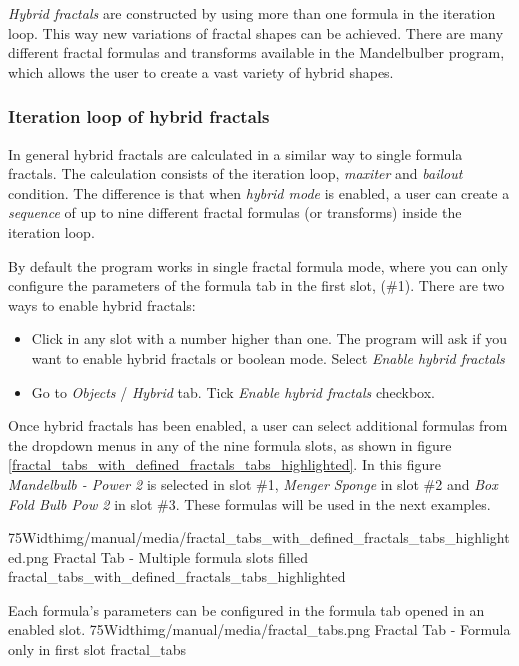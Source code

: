 \emph{Hybrid fractals} are constructed by using more than one formula in the iteration loop.
This way new variations of fractal shapes can be achieved. There are many different fractal formulas and transforms available in the Mandelbulber program, which allows the user to create a vast variety of hybrid shapes.

\subsubsection{Iteration loop of hybrid fractals}

In general hybrid fractals are calculated in a similar way to single formula fractals.
The calculation consists of the iteration loop, \emph{maxiter} and \emph{bailout} condition. The
difference is that when \emph{hybrid mode} is enabled, a user can create a \emph{sequence} of up to nine different fractal formulas (or transforms) inside the iteration loop. 

By default the program works in single fractal formula mode, where you can only configure the parameters of the formula tab in the first slot,
(\#1). There are two ways to enable hybrid fractals:
\begin{itemize}
	\item Click in any slot with a number higher than one. The program will ask if you want to
	enable hybrid fractals or boolean mode. Select \emph{Enable hybrid fractals}
	\item Go to \emph{Objects} / \emph{Hybrid} tab. Tick \emph{Enable hybrid fractals} checkbox.
\end{itemize}

Once hybrid fractals has been enabled, a user can select additional formulas from the dropdown menus in any of the nine formula slots,
as shown in figure \ref{fractal_tabs_with_defined_fractals_tabs_highlighted}.
In this figure \emph{Mandelbulb - Power 2} is selected in slot \#1, \emph{Menger Sponge}
in slot \#2 and \emph{Box Fold Bulb Pow 2} in slot \#3. These formulas will be
used in the next examples.

\simpleImageWithCaption75Width{img/manual/media/fractal_tabs_with_defined_fractals_tabs_highlighted.png}
{Fractal Tab - Multiple formula slots filled}
{fractal_tabs_with_defined_fractals_tabs_highlighted}

Each formula's parameters can be configured in the formula tab opened in an enabled slot.
\simpleImageWithCaption75Width{img/manual/media/fractal_tabs.png}
{Fractal Tab - Formula only in first slot}
{fractal_tabs}

